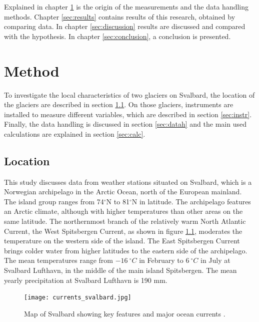 \documentclass[11pt]{report}
\begin{document}
Explained in chapter \ref{sec:method} is the origin of the measurements and the data handling methods. Chapter \ref{sec:results} contains results of this research, obtained by comparing data. In chapter \ref{sec:discussion} results are discussed and compared with the hypothesis. In chapter \ref{sec:conclusion}, a conclusion is presented.

\newpage

\chapter{Method}\label{sec:method}

To investigate the local characteristics of two glaciers on Svalbard, the location of the glaciers are described in section \ref{sec:loc}. On those glaciers, instruments are installed to measure different variables, which are described in section \ref{sec:instr}. Finally, the data handling is discussed in section \ref{sec:datah} and the main used calculations are explained in section \ref{sec:calc}.


\section{Location} \label{sec:loc}
This study discusses data from weather stations situated on Svalbard, which is a Norwegian archipelago in the Arctic Ocean, north of the European mainland. The island group ranges from 74$^\circ$N to 81$^\circ$N in latitude. The archipelago features an Arctic climate, although with higher temperatures than other areas on the same latitude. The northernmost branch of the relatively warm North Atlantic Current, the West Spitsbergen Current, as shown in figure \ref{fig:current}, moderates the temperature on the western side of the island. The East Spitsbergen Current brings colder water from higher latitudes to the eastern side of the archipelago. The mean temperatures range from $\SI{-16}{^\circ C}$ in February to $\SI{6}{^\circ C}$ in July \cite{1} at Svalbard Lufthavn, in the middle of the main island Spitsbergen. The mean yearly precipitation at Svalbard Lufthavn is 190 mm. 

\begin{figure}[h]
\texttt{[image: currents\_svalbard.jpg]}
\centering{}
\caption{Map of Svalbard showing key features and major ocean currents \cite{2}.}
\label{fig:current}
\end{figure}
\end{document}
